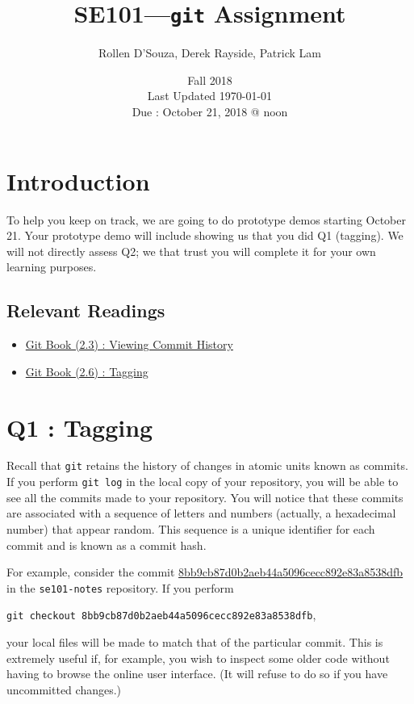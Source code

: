 \documentclass{article}
\begin{document}
\title{\vspace{-0.5in}SE101---\texttt{git} Assignment}
\author{Rollen D'Souza, Derek Rayside, Patrick Lam}
\date{Fall 2018\\Last Updated \today\\Due : October 21, 2018 @ noon}
\maketitle

\section*{Introduction}
To help you keep on track, we are going to do prototype demos starting October 21. Your prototype demo will include showing us that you did Q1 (tagging). We will not directly assess Q2; we that trust you will complete it for your own learning purposes.

\subsection*{Relevant Readings}
\begin{itemize}    
    \item\href{https://git-scm.com/book/en/v2/Git-Basics-Viewing-the-Commit-History}{Git Book (2.3) : Viewing Commit History}
    \item\href{https://git-scm.com/book/en/v2/Git-Basics-Tagging}{Git Book (2.6) : Tagging}
\end{itemize}

\section*{Q1 : Tagging}
Recall that \texttt{git} retains the history of changes in atomic units known as commits. If you perform \texttt{git log} in the local copy of your repository, you will be able to see all the commits made to your repository. You will notice that these commits are associated with a sequence of letters and numbers (actually, a hexadecimal number) that appear random. This sequence is a unique identifier for each commit and is known as a commit hash.

For example, consider the commit \href{https://github.com/patricklam/se101-f18/commit/8bb9cb87d0b2aeb44a5096cecc892e83a8538dfb}{8bb9cb87d0b2aeb44a5096cecc892e83a8538dfb} in the \texttt{se101-notes} repository. If you perform

\begin{center}
  \texttt{git checkout 8bb9cb87d0b2aeb44a5096cecc892e83a8538dfb},
\end{center}
\noindent
your local files will be made to match that of the particular commit. This is extremely useful if, for example, you wish to inspect some older code without having to browse the online user interface. (It will refuse to do so if you have uncommitted changes.)
\end{document}
